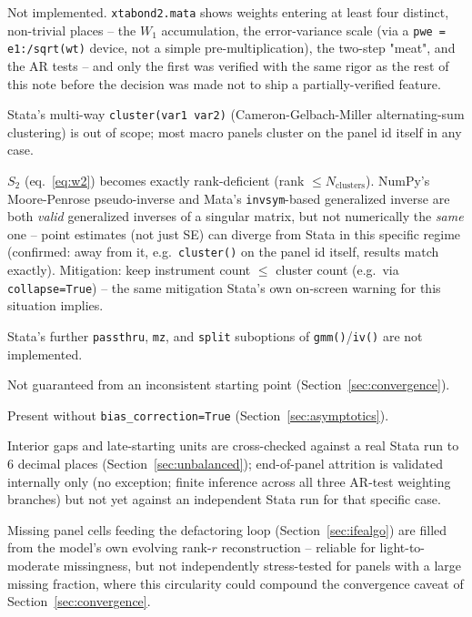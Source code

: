 \documentclass[11pt,a4paper]{article}
\begin{document}
\begin{description}[nosep]
  \item[Weights (\texttt{pweight}/\texttt{aweight}/\texttt{fweight})]
    Not implemented. \texttt{xtabond2.mata} shows weights entering at least
    four distinct, non-trivial places -- the $W_1$ accumulation, the
    error-variance scale (via a \texttt{pwe = e1:/sqrt(wt)} device, not a
    simple pre-multiplication), the two-step "meat", and the AR tests -- and
    only the first was verified with the same rigor as the rest of this
    note before the decision was made not to ship a partially-verified
    feature.
  \item[\texttt{cluster()}: single variable only] Stata's multi-way
    \texttt{cluster(var1 var2)} (Cameron-Gelbach-Miller alternating-sum
    clustering) is out of scope; most macro panels cluster on the panel id
    itself in any case.
  \item[\texttt{cluster()} + \texttt{twostep}/\texttt{robust}, instruments
    $>$ clusters] $S_2$ (eq.~\ref{eq:w2}) becomes exactly rank-deficient
    (rank $\le N_{\mathrm{clusters}}$). NumPy's Moore-Penrose pseudo-inverse
    and Mata's \texttt{invsym}-based generalized inverse are both
    \emph{valid} generalized inverses of a singular matrix, but not
    numerically the \emph{same} one -- point estimates (not just SE) can
    diverge from Stata in this specific regime (confirmed: away from it,
    e.g.\ \texttt{cluster()} on the panel id itself, results match exactly).
    Mitigation: keep instrument count $\le$ cluster count (e.g.\ via
    \texttt{collapse=True}) -- the same mitigation Stata's own on-screen
    warning for this situation implies.
  \item[\texttt{GMMStyle}/\texttt{IVStyle}] Stata's further
    \texttt{passthru}, \texttt{mz}, and \texttt{split} suboptions of
    \texttt{gmm()}/\texttt{iv()} are not implemented.
  \item[IFE-GMM convergence] Not guaranteed from an inconsistent starting
    point (Section~\ref{sec:convergence}).
  \item[IFE-GMM point-estimate bias] Present without
    \texttt{bias\_correction=True} (Section~\ref{sec:asymptotics}).
  \item[Unbalanced panels: attrition] Interior gaps and late-starting units
    are cross-checked against a real Stata run to 6 decimal places
    (Section~\ref{sec:unbalanced}); end-of-panel attrition is validated
    internally only (no exception; finite inference across all three
    AR-test weighting branches) but not yet against an independent Stata
    run for that specific case.
  \item[IFE-GMM imputation under heavy missingness] Missing panel cells
    feeding the defactoring loop (Section~\ref{sec:ifealgo}) are filled
    from the model's own evolving rank-$r$ reconstruction -- reliable for
    light-to-moderate missingness, but not independently stress-tested for
    panels with a large missing fraction, where this circularity could
    compound the convergence caveat of Section~\ref{sec:convergence}.
\end{description}
\end{document}
